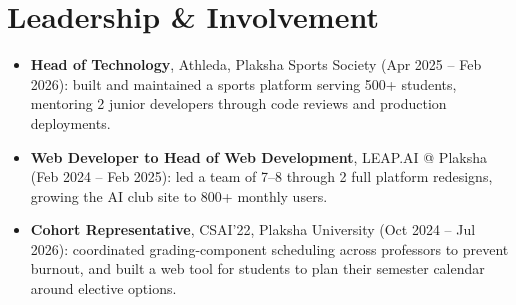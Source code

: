 \documentclass[11pt,letterpaper]{article}
\makeatletter
\newcommand{\cventry}[4]{%
    \begin{tabularx}{\linewidth}{@{}Y r@{}}
        \textbf{#1} & \textbf{\footnotesize #2} \\
        \textit{\footnotesize #3} & \textit{\footnotesize #4} \\
    \end{tabularx}%
    \vspace{0.3ex}
}
\makeatother
\begin{document}
%
 
\section*{Leadership \& Involvement}
\vspace{-0.5ex}
\begin{itemize}
    \item \textbf{Head of Technology}, Athleda, Plaksha Sports Society (Apr 2025 -- Feb 2026): built and maintained a sports platform serving 500+ students, mentoring 2 junior developers through code reviews and production deployments.
    \item \textbf{Web Developer to Head of Web Development}, LEAP.AI @ Plaksha (Feb 2024 -- Feb 2025): led a team of 7--8 through 2 full platform redesigns, growing the AI club site to 800+ monthly users.
    \item \textbf{Cohort Representative}, CSAI'22, Plaksha University (Oct 2024 -- Jul 2026): coordinated grading-component scheduling across professors to prevent burnout, and built a web tool for students to plan their semester calendar around elective options.
\end{itemize}
 
\end{document}

